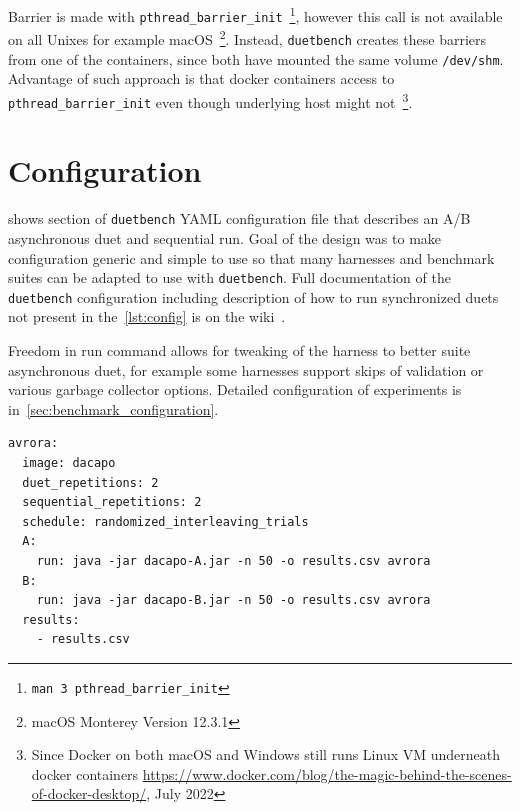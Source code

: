 Barrier is made with \lstinline{pthread_barrier_init}~\footnote{\lstinline{man 3 pthread_barrier_init}}, however this call is not available on all Unixes for example macOS~\footnote{macOS Monterey Version 12.3.1}.
Instead, \lstinline{duetbench} creates these barriers from one of the containers, since both have mounted the same volume \lstinline{/dev/shm}.
Advantage of such approach is that docker containers access to \lstinline{pthread_barrier_init} even though underlying host might not~\footnote{Since Docker on both macOS and Windows still runs Linux VM underneath docker containers \url{https://www.docker.com/blog/the-magic-behind-the-scenes-of-docker-desktop/}, July 2022}.

\section{Configuration}
\label{sec:configuration}

 shows section of \lstinline{duetbench} YAML configuration file that describes an A/B asynchronous duet and sequential run.
Goal of the design was to make configuration generic and simple to use so that many harnesses and benchmark suites can be adapted to use with \lstinline{duetbench}.
Full documentation of the \lstinline{duetbench} configuration including description of how to run synchronized duets not present in the~\cref{lst:config} is on the wiki~\cite{wiki}.

Freedom in run command allows for tweaking of the harness to better suite asynchronous duet, for example some harnesses support skips of validation or various garbage collector options.
Detailed configuration of experiments is in~\cref{sec:benchmark_configuration}.

\begin{listing}
    \begin{lstlisting}
avrora:
  image: dacapo
  duet_repetitions: 2
  sequential_repetitions: 2
  schedule: randomized_interleaving_trials
  A:
    run: java -jar dacapo-A.jar -n 50 -o results.csv avrora
  B:
    run: java -jar dacapo-B.jar -n 50 -o results.csv avrora
  results:
    - results.csv
    \end{lstlisting}
    \caption{
        Example part of YAML configuration file for \lstinline{duetbench} that runs \lstinline{avrora} benchmark from the Dacapo suite.
        In this case both A and B versions are packaged in single container image as Java JAR archives.
        Run command specifies how to invoke the dacapo harness --- 50 iterations, results in \lstinline{results.csv} and run only \lstinline{avrora} benchmark.
        All the result files or directories need to specified in \lstinline{results} array field.
        Note correspondence between user input fields from this configuration and parameters in angled brackets from~\cref{fig:duetbench_sequence}.
        Furthermore, user can specify number of repetitions for both asynchronous duet and sequential measurements, as well as scheduling strategy for those runs.
    }
    \label{lst:config}
\end{listing}

